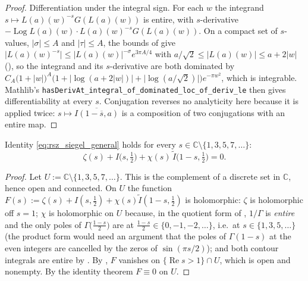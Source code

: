 \begin{proof}
\leanok
Differentiation under the integral sign.  For each $w$ the integrand
$s\mapsto L(a)(w)^{-s}G(L(a)(w))$ is entire, with $s$-derivative
$-\operatorname{Log}L(a)(w)\cdot L(a)(w)^{-s}G(L(a)(w))$.  On a compact set of $s$-values,
$\lvert\sigma\rvert\le A$ and $\lvert\tau\rvert\le A$, the bounds of
 give
$\lvert L(a)(w)^{-s}\rvert\le\lvert L(a)(w)\rvert^{-\sigma}e^{3\pi A/4}$ with
$a/\sqrt2\le\lvert L(a)(w)\rvert\le a+2\lvert w\rvert$ (), so the
integrand and its $s$-derivative are both dominated by
$C_{A}\bigl(1+\lvert w\rvert\bigr)^{A}\bigl(1+\bigl\lvert\log(a+2\lvert
w\rvert)\bigr\rvert+\lvert\log(a/\sqrt2)\rvert\bigr)e^{-\pi w^{2}}$, which is integrable.
Mathlib's \texttt{hasDerivAt\_integral\_of\_dominated\_loc\_of\_deriv\_le} then gives
differentiability at every $s$.  Conjugation reverses no analyticity here because it is
applied twice: $s\mapsto\overline{I(1-\overline s,a)}$ is a composition of two conjugations
with an entire map.
\end{proof}

\begin{theorem}
\label{thm:rsz_general}
\leanok
{}
Identity \eqref{eq:rsz_siegel_general} holds for every
$s\in\mathbb{C}\setminus\{1,3,5,7,\dots\}$:
\[
  \zeta(s)+I\bigl(s,\tfrac12\bigr)+\chi(s)\,\widetilde I\bigl(1-s,\tfrac12\bigr)=0 .
\]
\end{theorem}

\begin{proof}
\leanok
Let $U:=\mathbb{C}\setminus\{1,3,5,7,\dots\}$.  This is the complement of a discrete set in
$\mathbb{C}$, hence open and connected.  On $U$ the function
$F(s):=\zeta(s)+I(s,\tfrac12)+\chi(s)\widetilde I(1-s,\tfrac12)$ is holomorphic: $\zeta$ is
holomorphic off $s=1$; $\chi$ is holomorphic on $U$ because, in the quotient form of
, $1/\Gamma$ is \emph{entire} and the only poles of
$\Gamma\bigl(\frac{1-s}2\bigr)$ are at $\frac{1-s}2\in\{0,-1,-2,\dots\}$, i.e.\ at
$s\in\{1,3,5,\dots\}$ (the product form would need an argument that the poles of
$\Gamma(1-s)$ at the even integers are cancelled by the zeros of $\sin(\pi s/2)$); and both
contour integrals are entire
by .  By , $F$ vanishes on
$\{\operatorname{Re}s>1\}\cap U$, which is open and nonempty.  By the identity theorem
$F\equiv0$ on $U$.
\end{proof}

